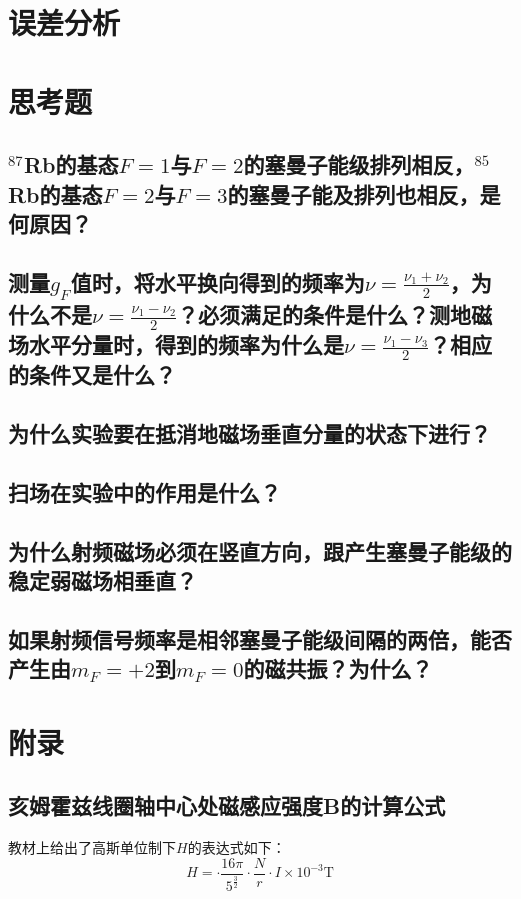 \documentclass[a4paper]{article}
\begin{document}
\section{误差分析}

\section{思考题}
\subsection{$^{87}$Rb的基态$F=1$与$F=2$的塞曼子能级排列相反，$^{85}$Rb的基态$F=2$与$F=3$的塞曼子能及排列也相反，是何原因？}
\subsection{测量$g_F$值时，将水平换向得到的频率为$\nu = \frac{\nu_1+\nu_2}{2}$，为什么不是$\nu = \frac{\nu_1-\nu_2}{2}$？必须满足的条件是什么？测地磁场水平分量时，得到的频率为什么是$\nu = \frac{\nu_1-\nu_3}{2}$？相应的条件又是什么？}
\subsection{为什么实验要在抵消地磁场垂直分量的状态下进行？}
\subsection{扫场在实验中的作用是什么？}
\subsection{为什么射频磁场必须在竖直方向，跟产生塞曼子能级的稳定弱磁场相垂直？}
\subsection{如果射频信号频率是相邻塞曼子能级间隔的两倍，能否产生由$m_F = +2$到$m_F = 0$的磁共振？为什么？}


\section{附录}
\subsection{亥姆霍兹线圈轴中心处磁感应强度B的计算公式}
教材上给出了高斯单位制下$H$的表达式如下：
\begin{equation}
H = \cdot \frac{16\pi}{5^{\frac{3}{2}}}\cdot \frac{N}{r}\cdot I\times 10^{-3}\text{T}\label{eq9}
\end{equation}
\end{document}
